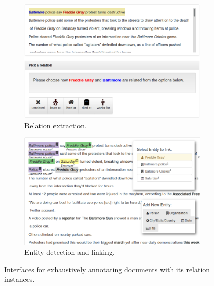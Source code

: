 \begin{figure}[t]
\begin{subfigure}{0.49\textwidth}
  \includegraphics[width=\textwidth]{figures/interface/relation-interface}
  \caption{\label{fig:relation-interface} Relation extraction.}
\end{subfigure}
\hfill
\begin{subfigure}{0.49\textwidth}
  \includegraphics[width=\textwidth]{figures/interface/extraction-interface}
  \caption{\label{fig:entity-interface} Entity detection and linking.}
\end{subfigure}
\caption{\label{fig:interfaces} Interfaces for exhaustively annotating documents with its relation instances.}
\end{figure}

